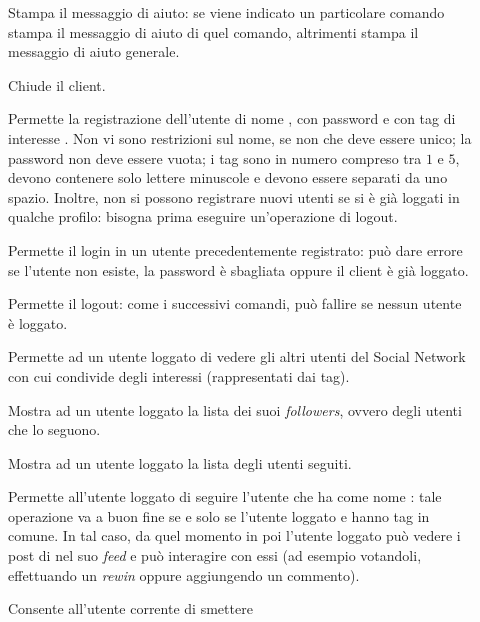 \documentclass[
    oneside,
    10pt,
    language=italian,
    a4paper,
    article
]{notes}
\begin{document}
\begin{description}
    \item[] Stampa il messaggio di aiuto: se viene indicato
        un particolare comando stampa il messaggio di aiuto di quel comando,
        altrimenti stampa il messaggio di aiuto generale.
    \item[] Chiude il client.
    \item[] Permette la registrazione
        dell'utente di nome , con password  e
        con tag di interesse . Non vi sono restrizioni sul nome, se
        non che deve essere unico; la password non deve essere vuota; i tag
        sono in numero compreso tra $1$ e $5$, devono contenere solo lettere
        minuscole e devono essere separati da uno spazio. Inoltre, non si possono
        registrare nuovi utenti se si è già loggati in qualche profilo: bisogna
        prima eseguire un'operazione di logout.
    \item[] Permette il login in un utente
        precedentemente registrato: può dare errore se l'utente non esiste,
        la password è sbagliata oppure il client è già loggato.
    \item[] Permette il logout: come i successivi comandi, può fallire
        se nessun utente è loggato.
    \item[] Permette ad un utente loggato di vedere gli altri
        utenti del Social Network con cui condivide degli interessi (rappresentati
        dai tag).
    \item[] Mostra ad un utente loggato la lista dei suoi 
        \emph{followers}, ovvero degli utenti che lo seguono.
    \item[] Mostra ad un utente loggato la lista degli utenti
        seguiti.
    \item[] Permette all'utente loggato di seguire l'utente
        che ha come nome : tale operazione va a buon fine se e
        solo se l'utente loggato e  hanno tag in comune. In tal
        caso, da quel momento in poi l'utente loggato può vedere i post di
         nel suo \emph{feed} e può interagire con essi (ad esempio
        votandoli, effettuando un \emph{rewin} oppure aggiungendo un commento).
    \item[] Consente all'utente corrente di smettere

\end{description}
\end{document}
